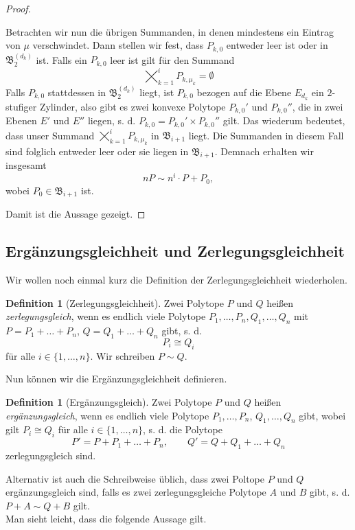 \documentclass[11pt,titlepage]{article}
\theoremstyle{definition}
\newtheorem{definition}[theorem]{Definition}
\theoremstyle{remark}
\begin{document}
\begin{proof}
\begin{enumerate}
			Betrachten wir nun die übrigen Summanden, in denen mindestens 
			ein Eintrag von $\mu$ verschwindet. Dann stellen wir fest, dass 
			$P_{k,0}$ entweder leer ist oder in $\mathfrak{B}_2^{(d_k)}$ ist. 
			Falls ein $P_{k,0}$ leer ist gilt für den Summand
			\[\bigtimes_{k=1}^i P_{k,\mu_k}=\emptyset\]
			Falls $P_{k,0}$ stattdessen in $\mathfrak{B}_2^{(d_k)}$ liegt, 
			ist $P_{k,0}$ bezogen auf die Ebene $E_{d_k}$ ein $2$-stufiger 
			Zylinder, also gibt es zwei konvexe Polytope $P_{k,0}'$ 
			und $P_{k,0}''$, die in zwei Ebenen $E'$ und $E''$ liegen, s. d. 
			$P_{k,0}=P_{k,0}'\times P_{k,0}''$ gilt. 
			Das wiederum bedeutet, dass unser Summand 
			$\bigtimes_{k=1}^i P_{k,\mu_k}$ in $\mathfrak{B}_{i+1}$ liegt. 
			Die Summanden in diesem Fall sind folglich entweder leer oder sie 
			liegen in $\mathfrak{B}_{i+1}$.
			Demnach erhalten wir insgesamt
			\[nP\sim n^i\cdot P + P_0,\]
			wobei $P_0\in \mathfrak{B}_{i+1}$ ist.
		\end{enumerate}
		Damit ist die Aussage gezeigt.
	\end{proof}
	
	\subsection{Ergänzungsgleichheit und Zerlegungsgleichheit}
	
	Wir wollen noch einmal kurz die Definition der Zerlegungsgleichheit wiederholen.
	
	\begin{definition}[Zerlegungsgleichheit]
		Zwei Polytope $P$ und $Q$ heißen \textsl{zerlegungsgleich}, wenn es endlich viele Polytope 
		$P_1,\ldots,P_n,Q_1,\ldots,Q_n$ mit $P=P_1 +\ldots +P_n$,  $Q=Q_1 +\ldots+Q_n$ 
		gibt, s. d. 
		\[P_i\cong Q_i\]
		für alle $i\in\{1,\ldots,n\}$. Wir schreiben $P\sim Q$.
	\end{definition}
	
	Nun können wir die Ergänzungsgleichheit definieren.
	
	\begin{definition}[Ergänzungsgleich]
		Zwei Polytope $P$ und $Q$ heißen \textsl{ergänzungsgleich}, wenn es endlich viele Polytope 
		$P_1,\ldots,P_n$, $Q_1,\ldots,Q_n$ gibt, wobei gilt $P_i\cong Q_i$ für alle $i\in\{1,\ldots,n\}$, s. d. die Polytope
		\[P'=P+P_1+\ldots+P_n,\qquad Q'=Q+Q_1+\ldots+Q_n\]
		zerlegungsgleich sind.
	\end{definition}
	
	Alternativ ist auch die Schreibweise üblich, dass zwei Poltope $P$ und $Q$
	ergänzungsgleich sind, falls es zwei zerlegungsgleiche Polytope 
	$A$ und $B$ gibt, s. d. $P+A\sim Q+B$ gilt. \\
	Man sieht leicht, dass die folgende Aussage gilt.
	
\end{document}
